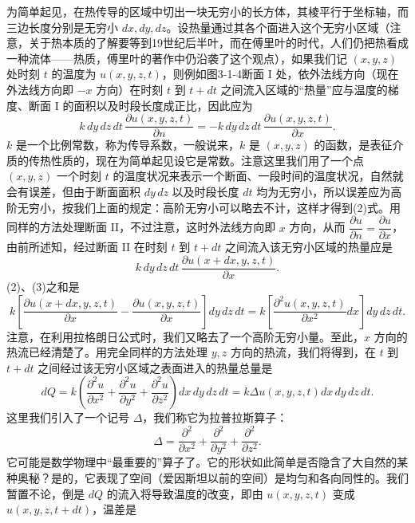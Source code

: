 为简单起见，在热传导的区域中切出一块无穷小的长方体，其棱平行于坐标轴，而三边长度分别是无穷小 $dx,dy,dz$。设热量通过其各个面进入这个无穷小区域（注意，关于热本质的了解要等到19世纪后半叶，而在傅里叶的时代，人们仍把热看成一种流体——热质，傅里叶的著作中仍沿袭了这个观点），如果我们记 $(x,y,z)$ 处时刻 $t$ 的温度为 $u(x,y,z,t)$，则例如图3-1-4断面 I 处，依外法线方向（现在外法线方向即 $-x$ 方向）在时刻 $t$ 到 $t+dt$ 之间流入区域的“热量”应与温度的梯度、断面 I 的面积以及时段长度成正比，因此应为
\begin{equation}
 k\,dy\,dz\,dt\,\frac{\partial u(x,y,z,t)}{\partial n}
 =-k\,dy\,dz\,dt\,\frac{\partial u(x,y,z,t)}{\partial x}.
 \tag{2}
\end{equation}
$k$ 是一个比例常数，称为传导系数，一般说来，$k$ 是 $(x,y,z)$ 的函数，是表征介质的传热性质的，现在为简单起见设它是常数。注意这里我们用了一个点 $(x,y,z)$ 一个时刻 $t$ 的温度状况来表示一个断面、一段时间的温度状况，自然就会有误差，但由于断面面积 $dy\,dz$ 以及时段长度 $dt$ 均为无穷小，所以误差应为高阶无穷小，按我们上面的规定：高阶无穷小可以略去不计，这样才得到(2)式。用同样的方法处理断面 II，不过注意，这时外法线方向即 $x$ 方向，从而 $\dfrac{\partial u}{\partial n}=\dfrac{\partial u}{\partial x}$，由前所述知，经过断面 II 在时刻 $t$ 到 $t+dt$ 之间流入该无穷小区域的热量应是
\begin{equation}
 k\,dy\,dz\,dt\,\frac{\partial u(x+dx,y,z,t)}{\partial x}.
 \tag{3}
\end{equation}
(2)、(3)之和是
\begin{equation}
 k\left[\frac{\partial u(x+dx,y,z,t)}{\partial x}-\frac{\partial u(x,y,z,t)}{\partial x}\right]dy\,dz\,dt
 =k\left[\frac{\partial^2u(x,y,z,t)}{\partial x^2}dx\right]dy\,dz\,dt.
 \tag{4}
\end{equation}
注意，在利用拉格朗日公式时，我们又略去了一个高阶无穷小量。至此，$x$ 方向的热流已经清楚了。用完全同样的方法处理 $y,z$ 方向的热流，我们将得到，在 $t$ 到 $t+dt$ 之间经过该无穷小区域之表面进入的热量总量是
\begin{equation}
 dQ=k\left(\frac{\partial^2u}{\partial x^2}+\frac{\partial^2u}{\partial y^2}+\frac{\partial^2u}{\partial z^2}\right)dx\,dy\,dz\,dt
 =k\Delta u(x,y,z,t)dx\,dy\,dz\,dt.
 \tag{5}
\end{equation}
这里我们引入了一个记号 $\Delta$，我们称它为拉普拉斯算子：
\[
\Delta=\frac{\partial^2}{\partial x^2}+\frac{\partial^2}{\partial y^2}+\frac{\partial^2}{\partial z^2}.
\]
它可能是数学物理中“最重要的”算子了。它的形状如此简单是否隐含了大自然的某种奥秘？是的，它表现了空间（爱因斯坦以前的空间）是均匀和各向同性的。我们暂置不论，倒是 $dQ$ 的流入将导致温度的改变，即由 $u(x,y,z,t)$ 变成 $u(x,y,z,t+dt)$，温差是
